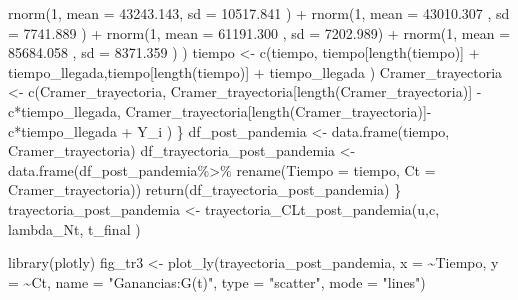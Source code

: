 \documentclass[
  us-letterpaper,
]{scrreprt}
\newenvironment{Shaded}{\begin{snugshade}}{\end{snugshade}}
\newcommand{\AttributeTok}[1]{\textcolor[rgb]{0.40,0.45,0.13}{#1}}
\newcommand{\DecValTok}[1]{\textcolor[rgb]{0.68,0.00,0.00}{#1}}
\newcommand{\FloatTok}[1]{\textcolor[rgb]{0.68,0.00,0.00}{#1}}
\newcommand{\FunctionTok}[1]{\textcolor[rgb]{0.28,0.35,0.67}{#1}}
\newcommand{\NormalTok}[1]{\textcolor[rgb]{0.00,0.23,0.31}{#1}}
\newcommand{\OtherTok}[1]{\textcolor[rgb]{0.00,0.23,0.31}{#1}}
\newcommand{\SpecialCharTok}[1]{\textcolor[rgb]{0.37,0.37,0.37}{#1}}
\newcommand{\StringTok}[1]{\textcolor[rgb]{0.13,0.47,0.30}{#1}}
\theoremstyle{plain}
\theoremstyle{plain}
\theoremstyle{definition}
\theoremstyle{remark}
\begin{document}
\begin{Shaded}
\begin{Highlighting}[]
\FunctionTok{rnorm}\NormalTok{(}\DecValTok{1}\NormalTok{, }\AttributeTok{mean =}   \FloatTok{43243.143}\NormalTok{, }\AttributeTok{sd =} \FloatTok{10517.841}\NormalTok{ ) }\SpecialCharTok{+} 
\FunctionTok{rnorm}\NormalTok{(}\DecValTok{1}\NormalTok{, }\AttributeTok{mean =} \FloatTok{43010.307}\NormalTok{  , }\AttributeTok{sd =} \FloatTok{7741.889}\NormalTok{ ) }\SpecialCharTok{+} 
\FunctionTok{rnorm}\NormalTok{(}\DecValTok{1}\NormalTok{, }\AttributeTok{mean =} \FloatTok{61191.300}\NormalTok{  , }\AttributeTok{sd =} \FloatTok{7202.989}\NormalTok{) }\SpecialCharTok{+} 
\FunctionTok{rnorm}\NormalTok{(}\DecValTok{1}\NormalTok{, }\AttributeTok{mean =}  \FloatTok{85684.058}\NormalTok{ , }\AttributeTok{sd =} \FloatTok{8371.359}\NormalTok{ ) ) }
\NormalTok{    tiempo }\OtherTok{\textless{}{-}} \FunctionTok{c}\NormalTok{(tiempo, tiempo[}\FunctionTok{length}\NormalTok{(tiempo)] }
    \SpecialCharTok{+}\NormalTok{ tiempo\_llegada,tiempo[}\FunctionTok{length}\NormalTok{(tiempo)]}
    \SpecialCharTok{+}\NormalTok{ tiempo\_llegada ) }
\NormalTok{    Cramer\_trayectoria }\OtherTok{\textless{}{-}} \FunctionTok{c}\NormalTok{(Cramer\_trayectoria,}
\NormalTok{    Cramer\_trayectoria[}\FunctionTok{length}\NormalTok{(Cramer\_trayectoria)]}
    \SpecialCharTok{{-}}\NormalTok{ c}\SpecialCharTok{*}\NormalTok{tiempo\_llegada,}
\NormalTok{    Cramer\_trayectoria[}\FunctionTok{length}\NormalTok{(Cramer\_trayectoria)]}\SpecialCharTok{{-}}
\NormalTok{    c}\SpecialCharTok{*}\NormalTok{tiempo\_llegada }\SpecialCharTok{+}\NormalTok{  Y\_i )}
\NormalTok{  \}}
\NormalTok{  df\_post\_pandemia }\OtherTok{\textless{}{-}} \FunctionTok{data.frame}\NormalTok{(tiempo, Cramer\_trayectoria)}
\NormalTok{df\_trayectoria\_post\_pandemia }\OtherTok{\textless{}{-}} \FunctionTok{data.frame}\NormalTok{(df\_post\_pandemia}\SpecialCharTok{\%\textgreater{}\%}
                                        \FunctionTok{rename}\NormalTok{(}\AttributeTok{Tiempo =}\NormalTok{ tiempo,}
    \AttributeTok{Ct =}\NormalTok{ Cramer\_trayectoria))}
  \FunctionTok{return}\NormalTok{(df\_trayectoria\_post\_pandemia)}
\NormalTok{\}}
\NormalTok{trayectoria\_post\_pandemia }\OtherTok{\textless{}{-}} \FunctionTok{trayectoria\_CLt\_post\_pandemia}\NormalTok{(u,c,}
\NormalTok{                                            lambda\_Nt, t\_final )}

\FunctionTok{library}\NormalTok{(plotly)}
\NormalTok{fig\_tr3 }\OtherTok{\textless{}{-}} \FunctionTok{plot\_ly}\NormalTok{(trayectoria\_post\_pandemia, }\AttributeTok{x =} \SpecialCharTok{\textasciitilde{}}\NormalTok{Tiempo, }
                                              \AttributeTok{y =} \SpecialCharTok{\textasciitilde{}}\NormalTok{Ct,}
            \AttributeTok{name =} \StringTok{"Ganancias:G(t)"}\NormalTok{,}
            \AttributeTok{type =} \StringTok{"scatter"}\NormalTok{, }\AttributeTok{mode =} \StringTok{"lines"}\NormalTok{)}


\end{Highlighting}
\end{Shaded}
\end{document}
